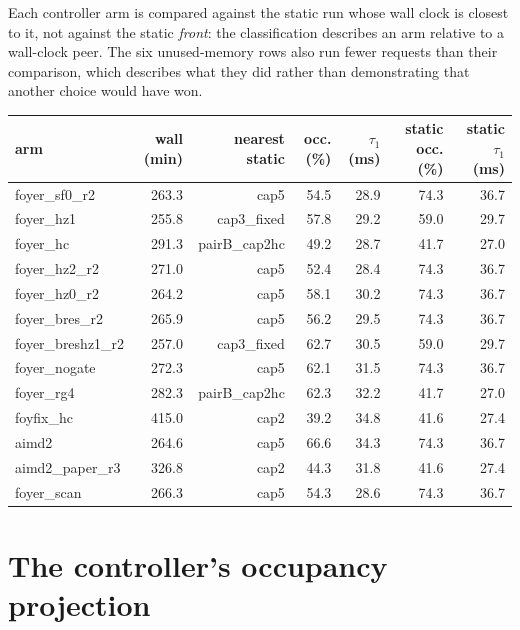 \documentclass[10pt]{article}
\begin{document}
Each controller arm is compared against the static run whose wall clock is
closest to it, not against the static \emph{front}: the classification describes
an arm relative to a wall-clock peer. The six unused-memory rows also run fewer
requests than their comparison, which describes what they did rather than
demonstrating that another choice would have won.
\begin{center}\footnotesize\setlength{\tabcolsep}{4pt}
\begin{tabular}{lrrrrrr}
\toprule
arm & wall (min) & nearest static & occ. (\%) & $\tau_1$ (ms) & static occ. (\%) & static $\tau_1$ (ms) \\
\midrule
foyer\_sf0\_r2 & 263.3 & cap5 & 54.5 & 28.9 & 74.3 & 36.7 \\
foyer\_hz1 & 255.8 & cap3\_fixed & 57.8 & 29.2 & 59.0 & 29.7 \\
foyer\_hc & 291.3 & pairB\_cap2hc & 49.2 & 28.7 & 41.7 & 27.0 \\
foyer\_hz2\_r2 & 271.0 & cap5 & 52.4 & 28.4 & 74.3 & 36.7 \\
foyer\_hz0\_r2 & 264.2 & cap5 & 58.1 & 30.2 & 74.3 & 36.7 \\
foyer\_bres\_r2 & 265.9 & cap5 & 56.2 & 29.5 & 74.3 & 36.7 \\
foyer\_breshz1\_r2 & 257.0 & cap3\_fixed & 62.7 & 30.5 & 59.0 & 29.7 \\
foyer\_nogate & 272.3 & cap5 & 62.1 & 31.5 & 74.3 & 36.7 \\
foyer\_rg4 & 282.3 & pairB\_cap2hc & 62.3 & 32.2 & 41.7 & 27.0 \\
foyfix\_hc & 415.0 & cap2 & 39.2 & 34.8 & 41.6 & 27.4 \\
aimd2 & 264.6 & cap5 & 66.6 & 34.3 & 74.3 & 36.7 \\
aimd2\_paper\_r3 & 326.8 & cap2 & 44.3 & 31.8 & 41.6 & 27.4 \\
foyer\_scan & 266.3 & cap5 & 54.3 & 28.6 & 74.3 & 36.7 \\
\bottomrule
\end{tabular}\end{center}

\section{The controller's occupancy projection}
\end{document}

